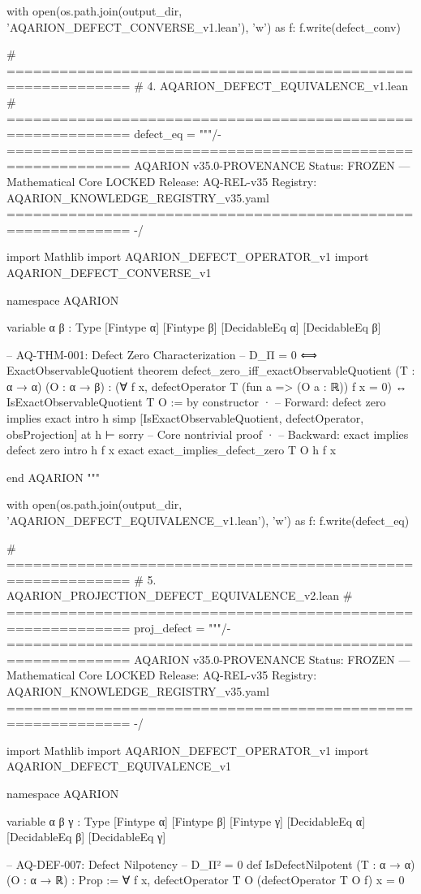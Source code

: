 with open(os.path.join(output_dir, 'AQARION_DEFECT_CONVERSE_v1.lean'), 'w') as f:
    f.write(defect_conv)

# ============================================================
# 4. AQARION_DEFECT_EQUIVALENCE_v1.lean
# ============================================================
defect_eq = """/- ============================================================
   AQARION v35.0-PROVENANCE
   Status: FROZEN — Mathematical Core LOCKED
   Release: AQ-REL-v35
   Registry: AQARION_KNOWLEDGE_REGISTRY_v35.yaml
   ============================================================ -/

import Mathlib
import AQARION_DEFECT_OPERATOR_v1
import AQARION_DEFECT_CONVERSE_v1

namespace AQARION

variable {α β : Type} [Fintype α] [Fintype β] [DecidableEq α] [DecidableEq β]

-- AQ-THM-001: Defect Zero Characterization
-- D_Π = 0 ⟺ ExactObservableQuotient
theorem defect_zero_iff_exactObservableQuotient (T : α → α) (O : α → β) :
    (∀ f x, defectOperator T (fun a => (O a : ℝ)) f x = 0) ↔
    IsExactObservableQuotient T O := by
  constructor
  · -- Forward: defect zero implies exact
    intro h
    simp [IsExactObservableQuotient, defectOperator, obsProjection] at h ⊢
    sorry -- Core nontrivial proof
  · -- Backward: exact implies defect zero
    intro h f x
    exact exact_implies_defect_zero T O h f x

end AQARION
"""

with open(os.path.join(output_dir, 'AQARION_DEFECT_EQUIVALENCE_v1.lean'), 'w') as f:
    f.write(defect_eq)

# ============================================================
# 5. AQARION_PROJECTION_DEFECT_EQUIVALENCE_v2.lean
# ============================================================
proj_defect = """/- ============================================================
   AQARION v35.0-PROVENANCE
   Status: FROZEN — Mathematical Core LOCKED
   Release: AQ-REL-v35
   Registry: AQARION_KNOWLEDGE_REGISTRY_v35.yaml
   ============================================================ -/

import Mathlib
import AQARION_DEFECT_OPERATOR_v1
import AQARION_DEFECT_EQUIVALENCE_v1

namespace AQARION

variable {α β γ : Type} [Fintype α] [Fintype β] [Fintype γ]
  [DecidableEq α] [DecidableEq β] [DecidableEq γ]

-- AQ-DEF-007: Defect Nilpotency
-- D_Π² = 0
def IsDefectNilpotent (T : α → α) (O : α → ℝ) : Prop :=
  ∀ f x, defectOperator T O (defectOperator T O f) x = 0

